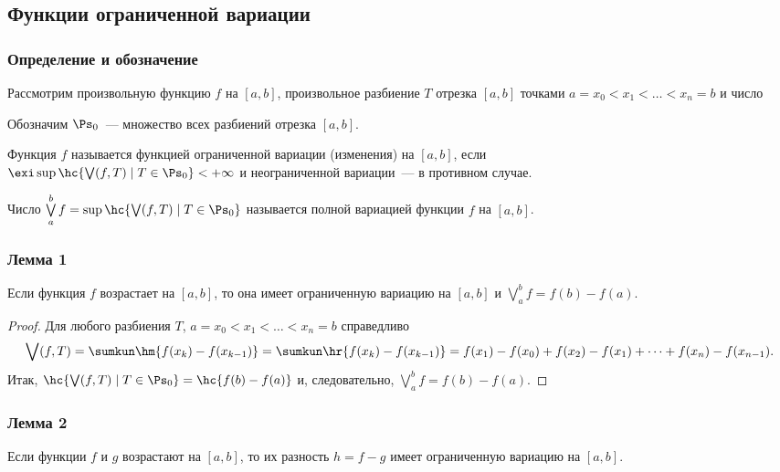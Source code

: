 \documentclass[a4paper]{article}
\begin{document}
\subsection{Функции ограниченной вариации}

\subsubsection{Определение и обозначение}

Рассмотрим произвольную функцию $f$ на $[a,b]$, произвольное
разбиение $T$ отрезка $[a,b]$ точками $a=x_0<x_1<\dots<x_n=b$ и
число 

Обозначим $\Ps_0$~--- множество всех разбиений отрезка $[a,b]$.

\begin{df*}
Функция $f$ называется функцией ограниченной вариации (изменения) на
$[a,b]$, если \\ $\exi \sup
\hc{\bigvee(f,T)\;|\;T\in\Ps_0}<+\infty$ и неограниченной
вариации~--- в противном случае.

Число $\bigvee\limits_a^b f = \sup\hc{\bigvee(f,T)\;|\;T\in\Ps_0}$
называется полной вариацией функции $f$ на $[a,b]$.
\end{df*}

\subsubsection{Лемма 1}

\begin{lemma}
Если функция $f$ возрастает на $[a,b]$, то она имеет ограниченную
вариацию на $[a,b]$ и $\bigvee\limits_a^b f = f(b)-f(a)$.
\end{lemma}

\begin{proof}
Для любого разбиения $T$, $a=x_0<x_1<\dots<x_n=b$ справедливо
$$\bigvee(f,T)=\sumkun\hm{f(x_k)-f(x_{k-1})}=\sumkun \hr{f(x_k)-f(x_{k-1})}=f(x_1) - f(x_0) + f(x_2) - f(x_1) + \dots +
f(x_n) - f(x_{n-1}).$$
Итак, $\hc{\bigvee(f,T)\;|\;T\in\Ps_0} =
\hc{f(b)-f(a)}$ и, следовательно, $\bigvee\limits_a^b f=f(b)-f(a)$.
\end{proof}

\subsubsection{Лемма 2}

\begin{lemma}
Если функции $f$ и $g$ возрастают на $[a,b]$, то их разность $h=f-g$
имеет ограниченную вариацию на $[a,b]$.
\end{lemma}
\end{document}
